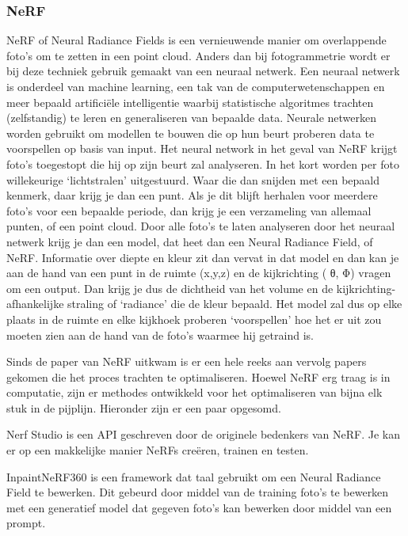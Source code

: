 \documentclass{hogent-article}
\begin{document}
\subsubsection{NeRF}

NeRF of Neural Radiance Fields is een vernieuwende manier om overlappende foto’s om te zetten in een point cloud. Anders dan bij fotogrammetrie wordt er bij deze techniek gebruik gemaakt van een neuraal netwerk.
Een neuraal netwerk is onderdeel van machine learning, een tak van de computerwetenschappen en meer bepaald artificiële intelligentie waarbij statistische algoritmes trachten (zelfstandig)  te leren en generaliseren van bepaalde data. Neurale netwerken worden gebruikt om modellen te bouwen die op hun beurt proberen data te voorspellen op basis van input. 
Het neural network in het geval van NeRF krijgt foto’s toegestopt die hij op zijn beurt zal analyseren. In het kort worden per foto willekeurige ‘lichtstralen’ uitgestuurd. Waar die dan snijden met een bepaald kenmerk, daar krijg je dan een punt. Als je dit blijft herhalen voor meerdere foto’s voor een bepaalde periode, dan krijg je een verzameling van allemaal punten, of een point cloud. 
Door alle foto’s te laten analyseren door het neuraal netwerk krijg je dan een model, dat heet dan een Neural Radiance Field, of NeRF. Informatie over diepte en kleur zit dan vervat in dat model en dan kan je aan de hand van een punt in de ruimte (x,y,z) en de kijkrichting ( θ, Φ) vragen om een output. Dan krijg je dus de dichtheid van het volume en de kijkrichting-afhankelijke straling of ‘radiance’ die de kleur bepaald. Het model zal dus  op elke plaats in de ruimte en elke kijkhoek proberen ‘voorspellen’ hoe het er uit zou moeten zien aan de hand van de foto’s waarmee hij getraind is. \autocite{Mildenhall2020}

Sinds de paper van NeRF uitkwam is er een hele reeks aan vervolg papers gekomen die het proces trachten te optimaliseren. Hoewel NeRF erg traag is in computatie, zijn er methodes ontwikkeld voor het optimaliseren van bijna elk stuk in de pijplijn. Hieronder zijn er een paar opgesomd.

Nerf Studio is een API  geschreven door de originele bedenkers van NeRF. Je kan er op een makkelijke manier NeRFs creëren, trainen en testen. \autocite{Tancik2023a}

InpaintNeRF360 is een framework dat taal gebruikt om een Neural Radiance Field te bewerken. Dit gebeurd door middel van de training foto’s te bewerken met een generatief model dat gegeven foto’s kan bewerken door middel van een prompt. \autocite{Wang2023a}
\end{document}
